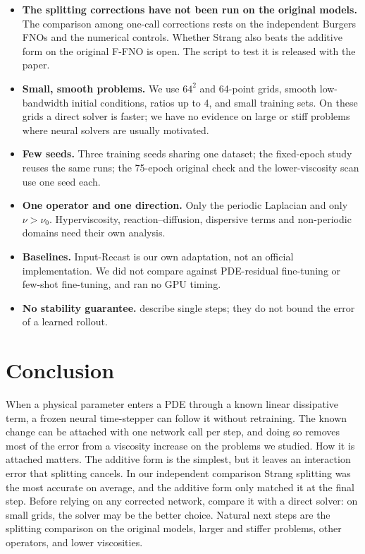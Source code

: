 \documentclass{article}
\theoremstyle{plain}
\begin{document}
\begin{itemize}
  \setlength\itemsep{1pt}
  \item \textbf{The splitting corrections have not been run on the original models.} The comparison among one-call corrections rests on the independent Burgers FNOs and the numerical controls. Whether Strang also beats the additive form on the original F-FNO is open. The script to test it is released with the paper.
  \item \textbf{Small, smooth problems.} We use $64^2$ and 64-point grids, smooth low-bandwidth initial conditions, ratios up to 4, and small training sets. On these grids a direct solver is faster; we have no evidence on large or stiff problems where neural solvers are usually motivated.
  \item \textbf{Few seeds.} Three training seeds sharing one dataset; the fixed-epoch study reuses the same runs; the 75-epoch original check and the lower-viscosity scan use one seed each.
  \item \textbf{One operator and one direction.} Only the periodic Laplacian and only $\nu>\nu_0$. Hyperviscosity, reaction--diffusion, dispersive terms and non-periodic domains need their own analysis.
  \item \textbf{Baselines.} Input-Recast is our own adaptation, not an official implementation. We did not compare against PDE-residual fine-tuning or few-shot fine-tuning, and ran no GPU timing.
  \item \textbf{No stability guarantee.}  describe single steps; they do not bound the error of a learned rollout.
\end{itemize}

\section{Conclusion}
\label{sec:conclusion}

When a physical parameter enters a PDE through a known linear dissipative term, a frozen neural time-stepper can follow it without retraining.
The known change can be attached with one network call per step, and doing so removes most of the error from a viscosity increase on the problems we studied.
How it is attached matters.
The additive form is the simplest, but it leaves an interaction error that splitting cancels. In our independent comparison Strang splitting was the most accurate on average, and the additive form only matched it at the final step.
Before relying on any corrected network, compare it with a direct solver: on small grids, the solver may be the better choice.
Natural next steps are the splitting comparison on the original models, larger and stiffer problems, other operators, and lower viscosities.
\end{document}
